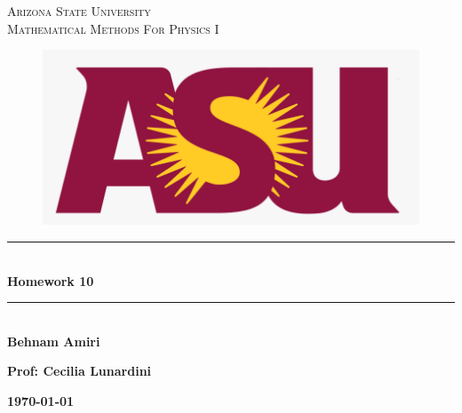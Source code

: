 \documentclass[fleqn]{article}
\begin{document}
  \begin{titlepage}

    \newcommand{\HRule}{\rule{\linewidth}{0.5mm}} %

    \center %
    

    \textsc{\LARGE Arizona State University}\\[1.5cm]

    \textsc{\LARGE Mathematical Methods For Physics I }\\[1.5cm]


    \begin{figure}
      \includegraphics[width=\linewidth]{asu.png}
    \end{figure}


    \HRule \\[0.4cm]
    { \huge \bfseries Homework 10}\\[0.4cm] 
    \HRule \\[1.5cm]
    
    \textbf{Behnam Amiri}

    \bigbreak

    \textbf{Prof: Cecilia Lunardini}

    \bigbreak


    \textbf{{\large \today}\\[2cm]}

    \vfill %

  \end{titlepage}
\end{document}
